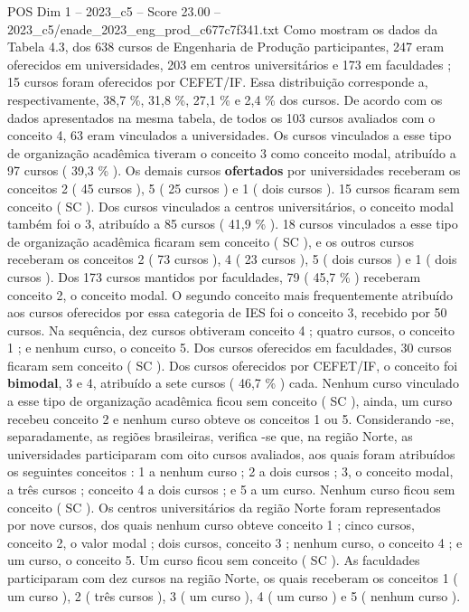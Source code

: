 \begin{textsample}{POS Dim 1 – 2023\_c5 – Score 23.00 – 2023\_c5/enade\_2023\_eng\_prod\_c677c7f341.txt}
Como mostram os dados da Tabela 4.3, dos 638 cursos de Engenharia de Produção participantes, 247 eram oferecidos em universidades, 203 em centros universitários e 173 em faculdades ; 15 cursos foram oferecidos por CEFET/IF.
Essa distribuição corresponde a, respectivamente, 38,7 \%, 31,8 \%, 27,1 \% e 2,4 \% dos cursos.
De acordo com os dados apresentados na mesma tabela, de todos os 103 cursos avaliados com o conceito 4, 63 eram vinculados a universidades.
Os cursos vinculados a esse tipo de organização acadêmica tiveram o conceito 3 como conceito modal, atribuído a 97 cursos ( 39,3 \% ).
Os demais cursos \textbf{ofertados} por universidades receberam os conceitos 2 ( 45 cursos ), 5 ( 25 cursos ) e 1 ( dois cursos ). 15 cursos ficaram sem conceito ( SC ).
Dos cursos vinculados a centros universitários, o conceito modal também foi o 3, atribuído a 85 cursos ( 41,9 \% ). 18 cursos vinculados a esse tipo de organização acadêmica ficaram sem conceito ( SC ), e os outros cursos receberam os conceitos 2 ( 73 cursos ), 4 ( 23 cursos ), 5 ( dois cursos ) e 1 ( dois cursos ).
Dos 173 cursos mantidos por faculdades, 79 ( 45,7 \% ) receberam conceito 2, o conceito modal.
O segundo conceito mais frequentemente atribuído aos cursos oferecidos por essa categoria de IES foi o conceito 3, recebido por 50 cursos.
Na sequência, dez cursos obtiveram conceito 4 ; quatro cursos, o conceito 1 ; e nenhum curso, o conceito 5.
Dos cursos oferecidos em faculdades, 30 cursos ficaram sem conceito ( SC ).
Dos cursos oferecidos por CEFET/IF, o conceito foi \textbf{bimodal}, 3 e 4, atribuído a sete cursos ( 46,7 \% ) cada.
Nenhum curso vinculado a esse tipo de organização acadêmica ficou sem conceito ( SC ), ainda, um curso recebeu conceito 2 e nenhum curso obteve os conceitos 1 ou 5.
Considerando -se, separadamente, as regiões brasileiras, verifica -se que, na região Norte, as universidades participaram com oito cursos avaliados, aos quais foram atribuídos os seguintes conceitos : 1 a nenhum curso ; 2 a dois cursos ; 3, o conceito modal, a três cursos ; conceito 4 a dois cursos ; e 5 a um curso.
Nenhum curso ficou sem conceito ( SC ).
Os centros universitários da região Norte foram representados por nove cursos, dos quais nenhum curso obteve conceito 1 ; cinco cursos, conceito 2, o valor modal ; dois cursos, conceito 3 ; nenhum curso, o conceito 4 ; e um curso, o conceito 5.
Um curso ficou sem conceito ( SC ).
As faculdades participaram com dez cursos na região Norte, os quais receberam os conceitos 1 ( um curso ), 2 ( três cursos ), 3 ( um curso ), 4 ( um curso ) e 5 ( nenhum curso ).

\end{textsample}
